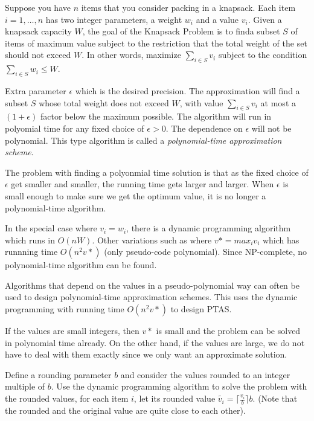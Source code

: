 \documentclass{proc}
\begin{document}
\begin{mdframed}
    Suppose you have $n$ items that you consider packing in a knapsack. Each item $i = 1, \ldots, n$ has two integer parameters, a weight $w_i$ and a value $v_i$. Given a knapsack capacity $W$, the goal of the Knapsack Problem is to finda subset $S$ of items of maximum value subject to the restriction that the total weight of the set should not exceed $W$. In other words, maximize $\sum_{i \in S} v_i$ subject to the condition $\sum_{i \in S} w_i \le W$.
    
    Extra parameter $\epsilon$ which is the desired precision. The approximation will find a subset $S$ whose total weight does not exceed $W$, with value $\sum_{i \in S} v_i$ at most a $(1 + \epsilon)$ factor below the maximum possible. 
    The algorithm will run in polyomial time for any fixed choice of $\epsilon > 0$. The dependence on $\epsilon$ will not be polynomial. This type algorithm is called a \textit{polynomial-time approximation scheme}.
\end{mdframed}

The problem with finding a polyonmial time solution is that as the fixed choice of $\epsilon$ get smaller and smaller, the running time gets larger and larger. When $\epsilon$ is small enough to make sure we get the optimum value, it is no longer a polynomial-time algorithm.

In the special case where $v_i = w_i$, there is a dynamic programming algorithm which runs in $O(nW)$. Other variations such as where $v* = max_i v_i$ which has runnning time $O(n^2 v*)$ (only pseudo-code polynomial). Since NP-complete, no polynomial-time algorithm can be found.

Algorithms that depend on the values in a pseudo-polynomial way can often be used to design polynomial-time approximation schemes. This uses the dynamic programming with running time $O(n^2 v*)$ to design PTAS.

If the values are small integers, then $v*$ is small and the problem can be solved in polynomial time already. On the other hand, if the values are large, we do not have to deal with them exactly since we only want an approximate solution. 

\begin{mdframed}
    Define a rounding parameter $b$ and consider the values rounded to an integer multiple of $b$. Use the dynamic programming algorithm to solve the problem with the rounded values, for each item $i$, let its rounded value $\tilde{v_i} = \lceil \frac{v_i}{b} \rceil b$. (Note that the rounded and the original value are quite close to each other).
\end{mdframed}
\end{document}
